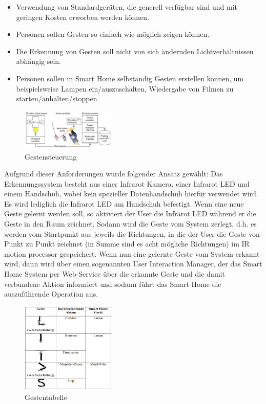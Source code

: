 \begin{itemize}
\item Verwendung von Standardgeräten, die generell verfügbar sind und mit geringen Kosten
erworben werden können.
\item Personen sollen Gesten so einfach wie möglich zeigen können.
\item Die Erkennung von Gesten soll nicht von sich ändernden Lichtverhältnissen abhängig sein.
\item Personen sollen in Smart Home selbständig Gesten erstellen können, um beispielsweise
Lampen ein/auszuschalten, Wiedergabe von Filmen zu starten/anhalten/stoppen.
\end{itemize}

\begin{figure}[h!]
	\centering
	\includegraphics[width=0.4\textwidth]{img/Feedback-Mechanismen/Gestensteuerung.png}
	\caption{Gestensteuerung}
	\label{fig:feedbackGestensteuerung}
\end{figure}

Aufgrund dieser Anforderungen wurde folgender Ansatz gewählt: Das Erkennungssystem besteht aus einer Infrarot Kamera, einer Infrarot LED und einem Handschuh, wobei kein spezieller Datenhandschuh hierfür verwendet wird. Es wird lediglich die Infrarot LED am Handschuh befestigt. Wenn eine neue Geste gelernt werden soll, so aktiviert der User die Infrarot LED während er die Geste in den Raum zeichnet. Sodann wird die Geste vom System zerlegt, d.h. es werden vom Startpunkt aus jeweils die Richtungen, in die der User die Geste von Punkt zu Punkt zeichnet (in Summe sind es acht mögliche Richtungen) im IR motion processor gespeichert. Wenn nun eine gelernte Geste vom System erkannt wird, dann wird über einen sogenannten \glqq User Interaction Manager\grqq , der das Smart Home System per Web-Service über die erkannte Geste und die damit verbundene Aktion informiert und sodann führt das Smart Home die auszuführende Operation aus.

\begin{figure}[h!]
	\centering
	\includegraphics[width=0.4\textwidth]{img/Feedback-Mechanismen/Gestentabelle.png}
	\caption{Gestentabelle}
	\label{fig:feedbackGestentabelle}
\end{figure}

